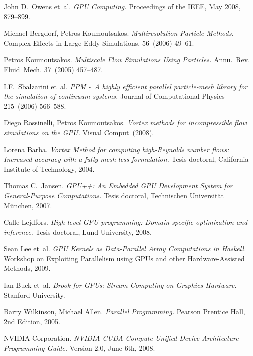 \documentclass[11pt,spanish]{article}
\newcommand{\reftitle}{\textit}
\begin{document}
\newpage
\begin{thebibliography}{99}
    John D.~Owens et~al.
    \reftitle{GPU Computing.}
    Proceedings of the IEEE, May 2008, 879--899.

    Michael Bergdorf, Petros Koumoutsakos.
    \reftitle{Multiresolution Particle Methods.}
    Complex Effects in Large Eddy Simulations, 56~(2006) 49--61.

    Petros Koumoutsakos.
    \reftitle{Multiscale Flow Simulations Using Particles.}
    Annu.~Rev. Fluid~Mech. 37~(2005) 457--487.

    I.F.~Sbalzarini et~al.
    \reftitle{PPM -~A highly efficient parallel particle-mesh library
      for the simulation of continuum systems.}
    Journal of Computational Physics 215~(2006) 566--588.

    Diego Rossinelli, Petros Koumoutsakos.
    \reftitle{Vortex methods for incompressible flow simulations on the GPU.}
    Visual Comput~(2008).

    Lorena Barba.
    \reftitle{Vortex Method for computing high-Reynolds number flows:
    Increased accuracy with a fully mesh-less formulation.}
    Tesis doctoral, California Institute of Technology, 2004.

    Thomas C.~Jansen.
    \reftitle{GPU++: An Embedded GPU Development System for
      General-Purpose Computations.}
    Tesis doctoral, Technischen Universität München, 2007.

    Calle Lejdfors.
    \reftitle{High-level GPU programming: Domain-specific optimization and inference.}
    Tesis doctoral, Lund University, 2008.

    Sean Lee et~al.
    \reftitle{GPU Kernels as Data-Parallel Array Computations in Haskell.}
    Workshop on Exploiting Parallelism using GPUs and other Hardware-Assisted
    Methods, 2009.

    Ian Buck et~al.
    \reftitle{Brook for GPUs: Stream Computing on Graphics Hardware.}
    Stanford University.

    Barry Wilkinson, Michael Allen.
    \reftitle{Parallel Programming.}
    Pearson Prentice Hall, 2nd Edition, 2005.

    NVIDIA Corporation.
    \reftitle{NVIDIA CUDA Compute Unified Device Architecture---Programming Guide.}
    Version 2.0, June 6th, 2008.


\end{thebibliography}
\end{document}
